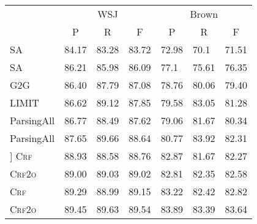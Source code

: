 \documentclass[11pt]{article}
\newcommand{\white}[1]{\textcolor{white}{#1}}
\newcommand*{\rulefiller}{\arrayrulecolor[gray]{0.95}\specialrule{\heavyrulewidth}{0pt}{-\heavyrulewidth}\arrayrulecolor{black}}
\begin{document}
\begin{figure}[tb!]
\begin{table}[tb!]
    \renewcommand{\arraystretch}{1.1}
    \setlength{\tabcolsep}{2.7pt}
    \centering
    \begin{small}
        \begin{tabular}{l ccc ccc}
            \toprule
            \rowcolor[gray]{0.95}                    & \multicolumn{3}{c}{WSJ} & \multicolumn{3}{c}{Brown}                                                                 \\
            \rulefiller	\cmidrule(lr){2-4}		\cmidrule(lr){5-7}
            \rowcolor[gray]{0.95}                    & P                       & R                         & F         & P             & R             & F         \\
            \midrule
            SA                        & 84.17                   & 83.28                     & 83.72         & 72.98         & 70.1\white{0} & 71.51         \\
            SA        & 86.21                   & 85.98                     & 86.09         & 77.1\white{0} & 75.61         & 76.35         \\
            G2G            & 86.40                   & 87.79                     & 87.08         & 78.76         & 80.06         & 79.40         \\
            LIMIT          & 86.62                   & 89.12                     & 87.85         & 79.58         & 83.05         & 81.28         \\
            ParsingAll     & 86.77                   & 88.49                     & 87.62         & 79.06         & 81.67         & 80.34         \\
            ParsingAll    & 87.65                   & 89.66                     & 88.64         & 80.77         & 83.92         & 82.31         \\\-10pt]
            \textsc{Crf}\rlap{}      & 88.93                   & 88.58                     & 88.76         & 82.87         & 81.67         & 82.27         \\
            \textsc{Crf2o}\rlap{}    & 89.00                   & 89.03                     & 89.02         & 82.81         & 82.35         & 82.58         \\
            \textsc{Crf}\rlap{}   & 89.29                   & 88.99                     & 89.15         & 83.22         & 82.42         & 82.82         \\
            \textsc{Crf2o}\rlap{} & 89.45                   & 89.63                     & 89.54         & 83.89         & 83.39         & 83.64         \\

\end{tabular}
\end{small}
\end{table}
\end{figure}
\end{document}
